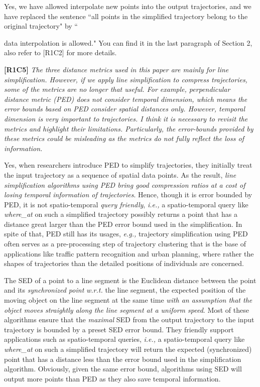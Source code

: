 \documentclass{letter}
\newcommand{\ie}{\emph{i.e.,}\xspace}
\newcommand{\eg}{\emph{e.g.,}\xspace}
\newcommand{\wrt}{\emph{w.r.t.}\xspace}
\begin{document}
Yes, we have allowed interpolate new points into the output trajectories, and we have replaced the sentence ``all points in the simplified trajectory belong to the original trajectory" by ``{data interpolation is allowed." You can find it in the last paragraph of Section 2, also refer to [R1C2] for more details. 


\textbf{[R1C5]} \emph{The three distance metrics used in this paper are mainly for line simplification. However, if we apply line simplification to compress trajectories, some of the metrics are no longer that useful. For example, perpendicular distance metric (PED) does not consider temporal dimension, which means the error bounds based on PED consider spatial distances only. However, temporal dimension is very important to trajectories. I think it is necessary to revisit the metrics and highlight their limitations. Particularly, the error-bounds provided by these metrics could be misleading as the metrics do not fully reflect the loss of information. }

Yes, when researchers introduce PED to simplify trajectories, they initially treat the input trajectory as a sequence of spatial data points. As the result, \emph{line simplification algorithms using PED bring good compression ratios at a cost of losing temporal information of trajectories}. Hence, though it is error bounded by PED, it is not spatio-temporal \emph{query friendly}, \ie a spatio-temporal query like \emph{where\_at} on such a simplified trajectory possibly returns a point that has a distance great larger than the PED error bound used in the simplification. 
{In spite of that, PED still has its usages, \eg trajectory simplification using PED often serves as a pre-processing step of trajectory clustering that is the base of applications like traffic pattern recognition and urban planning, where rather the shapes of trajectories than the detailed positions of individuals are concerned.}

The SED of a point to a line segment is the Euclidean distance between the point and its \emph{synchronized point} \wrt the line segment, the expected position of the moving object on the line segment at the same time \emph{with an assumption that the object moves straightly along the line segment at a uniform speed}. {Most of these algorithms ensure that the \emph{maximal} SED from the output trajectory to the input trajectory is bounded by a preset SED error bound.} 
They friendly support applications such as spatio-temporal queries, \ie a spatio-temporal query like \emph{where\_at} on such a simplified trajectory will return the expected (synchronized) point that has a distance less than the error bound used in the simplification algorithm.
{Obviously, given the same error bound, algorithms using SED will output more points than PED as they also save temporal information.}

}
\end{document}
